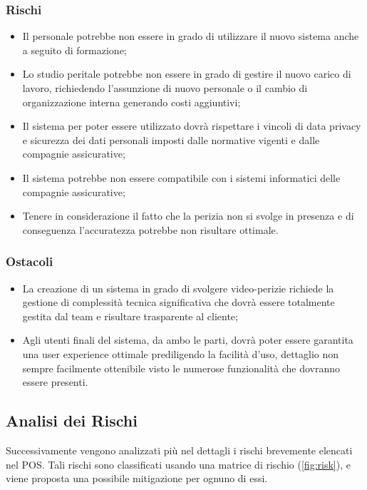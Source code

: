 \documentclass[a4paper,12pt, openright]{report}
\begin{document}
\subsubsection{Rischi}
\begin{itemize}
    \item Il personale potrebbe non essere in grado di utilizzare il nuovo sistema anche a seguito di formazione;
    \item Lo studio peritale potrebbe non essere in grado di gestire il nuovo carico di lavoro, richiedendo l'assunzione di nuovo personale o il cambio di organizzazione interna generando costi aggiuntivi;
    \item Il sistema per poter essere utilizzato dovrà rispettare i vincoli di data privacy e sicurezza dei dati personali imposti dalle normative vigenti e dalle compagnie assicurative;
    \item Il sistema potrebbe non essere compatibile con i sistemi informatici delle compagnie assicurative;
    \item Tenere in considerazione il fatto che la perizia non si svolge in presenza e di conseguenza l'accuratezza potrebbe non risultare ottimale.
\end{itemize}
\subsubsection{Ostacoli}
\begin{itemize}
    \item La creazione di un sistema in grado di svolgere video-perizie richiede la gestione di complessità tecnica significativa che dovrà essere totalmente gestita dal team e risultare trasparente al cliente;
    \item Agli utenti finali del sistema, da ambo le parti, dovrà poter essere garantita una user experience ottimale prediligendo la facilità d'uso, dettaglio non sempre facilmente ottenibile visto le numerose funzionalità che dovranno essere presenti. 
\end{itemize}

\subsection{Analisi dei Rischi}

Successivamente vengono analizzati più nel dettagli i rischi brevemente elencati nel POS. Tali rischi sono classificati usando una matrice di rischio (\cref{fig:risk}), e viene proposta una possibile mitigazione per ognuno di essi.
\end{document}
